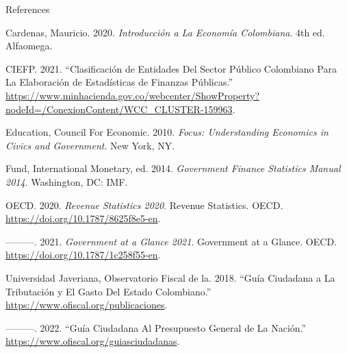 \documentclass[
  ignorenonframetext,
]{beamer}
\newlength{\cslhangindent}
\newenvironment{CSLReferences}[2] %
 {\begin{list}{}{%
  \setlength{\itemindent}{0pt}
  \setlength{\leftmargin}{0pt}
  \setlength{\parsep}{0pt}
  \ifodd #1
   \setlength{\leftmargin}{\cslhangindent}
   \setlength{\itemindent}{-1\cslhangindent}
  \fi
  \setlength{\itemsep}{#2\baselineskip}}}
 {\end{list}}
\begin{document}
\begin{frame}[allowframebreaks]{References}
\label{refs}
\begin{CSLReferences}{1}{0}
Cardenas, Mauricio. 2020. \emph{Introducción a La {Economía}
{Colombiana}}. 4th ed. Alfaomega.

CIEFP. 2021. {``Clasificación de Entidades Del {Sector} {Público}
Colombiano Para La Elaboración de {Estadísticas} de {Finanzas}
{Públicas}.''}
\url{https://www.minhacienda.gov.co/webcenter/ShowProperty?nodeId=/ConexionContent/WCC_CLUSTER-159963}.

Education, Council For Economic. 2010. \emph{Focus: {Understanding}
Economics in Civics and Government}. New York, NY.

Fund, International Monetary, ed. 2014. \emph{Government Finance
Statistics Manual 2014}. Washington, DC: IMF.

OECD. 2020. \emph{Revenue {Statistics} 2020}. Revenue {Statistics}.
OECD. \url{https://doi.org/10.1787/8625f8e5-en}.

---------. 2021. \emph{Government at a {Glance} 2021}. Government at a
{Glance}. OECD. \url{https://doi.org/10.1787/1c258f55-en}.

Universidad Javeriana, Observatorio Fiscal de la. 2018. {``Guía
Ciudadana a La Tributación y El Gasto Del {Estado} Colombiano.''}
\url{https://www.ofiscal.org/publicaciones}.

---------. 2022. {``Guía Ciudadana Al {Presupuesto} {General} de La
{Nación}.''} \url{https://www.ofiscal.org/guiasciudadanas}.

\end{CSLReferences}
\end{frame}
\end{document}
